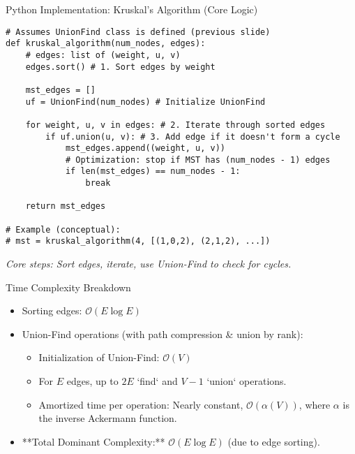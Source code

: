 \documentclass{beamer}
\begin{document}
\begin{frame}[fragile]{Python Implementation: Kruskal's Algorithm (Core Logic)}
\begin{verbatim}
# Assumes UnionFind class is defined (previous slide)
def kruskal_algorithm(num_nodes, edges):
    # edges: list of (weight, u, v)
    edges.sort() # 1. Sort edges by weight
    
    mst_edges = []
    uf = UnionFind(num_nodes) # Initialize UnionFind
    
    for weight, u, v in edges: # 2. Iterate through sorted edges
        if uf.union(u, v): # 3. Add edge if it doesn't form a cycle
            mst_edges.append((weight, u, v))
            # Optimization: stop if MST has (num_nodes - 1) edges
            if len(mst_edges) == num_nodes - 1: 
                break 
                
    return mst_edges

# Example (conceptual):
# mst = kruskal_algorithm(4, [(1,0,2), (2,1,2), ...])
\end{verbatim}
\vspace{2mm}
\tiny \textit{Core steps: Sort edges, iterate, use Union-Find to check for cycles.}
\end{frame}

\begin{frame}{Time Complexity Breakdown}
  \begin{itemize}
    \item Sorting edges: $\mathcal{O}(E \log E)$
    \item Union-Find operations (with path compression & union by rank):
      \begin{itemize}
        \item Initialization of Union-Find: $\mathcal{O}(V)$
        \item For $E$ edges, up to $2E$ `find` and $V-1$ `union` operations.
        \item Amortized time per operation: Nearly constant, $\mathcal{O}(\alpha(V))$, where $\alpha$ is the inverse Ackermann function.
      \end{itemize}
    \item **Total Dominant Complexity:** $\mathcal{O}(E \log E)$ (due to edge sorting).
  \end{itemize}
\end{frame}
\end{document}
